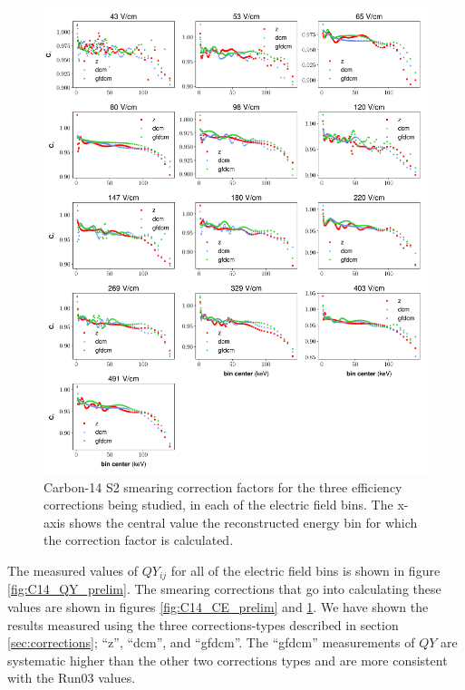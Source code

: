 \begin{figure}[h!]
\centering
\includegraphics[width=\textwidth]{Figures/C14_Ce_prelim.pdf}
\caption{Carbon-14 S2 smearing correction factors for the three efficiency corrections being studied, in each of the electric field bins. The x-axis shows the central value the reconstructed energy bin for which the correction factor is calculated.}
\label{fig:C14_Ce_prelim}
\end{figure}
The measured values of $QY_{ij}$ for all of the electric field bins is shown in figure \ref{fig:C14_QY_prelim}. The smearing corrections that go into calculating these values are shown in figures \ref{fig:C14_CE_prelim} and \ref{fig:C14_Ce_prelim}. We have shown the results measured using the three corrections-types described in section \ref{sec:corrections}; ``z'', ``dcm'', and ``gfdcm''. The ``gfdcm'' measurements of $QY$ are systematic higher than the other two corrections types and are more consistent with the Run03 values.

